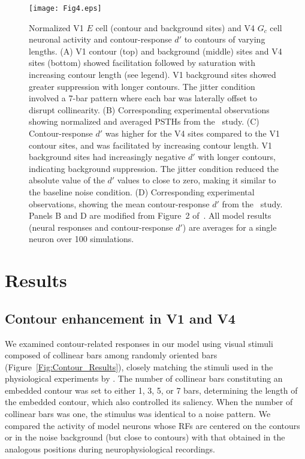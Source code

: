 \begin{figure*}
\begin{center}
\texttt{[image: Fig4.eps]}
\end{center}
\caption{Normalized V1 $E$ cell (contour and background sites) and V4
  $G_c$ cell neuronal activity and contour-response $d'$ to contours of
  varying lengths. (A) V1 contour (top) and background (middle) sites
  and V4 sites (bottom) showed facilitation followed by saturation
  with increasing contour length (see legend). V1 background sites
  showed greater suppression with longer contours. The jitter
  condition involved a 7-bar pattern where each bar was laterally
  offset to disrupt collinearity. (B) Corresponding experimental
  observations showing normalized and averaged PSTHs from
  the~\cite{Chen_etal14} study. 
  (C) Contour-response $d'$ was higher for the V4
  sites compared to the V1 contour sites, and was facilitated by
  increasing contour length. V1 background sites had increasingly
  negative $d'$ with longer contours, indicating background
  suppression. The jitter condition reduced the absolute value of the
  $d'$ values to close to zero, making it similar to the baseline
  noise condition. (D) Corresponding experimental observations,
  showing the mean contour-response $d'$ from the~\cite{Chen_etal14}
  study. 
  Panels B and D are modified from Figure~2 of~\cite{Chen_etal14}.
  All model results (neural responses and contour-response $d'$) are
  averages for a single neuron over 100 simulations.
}
\label{Fig:Neural_responses}
\end{figure*}

\section{Results}
\label{sec:results}
\subsection{Contour enhancement in V1 and V4}
We examined contour-related responses in our model using visual
stimuli composed of collinear bars among randomly oriented bars
(Figure~\ref{Fig:Contour_Results}), closely matching the stimuli used
in the physiological experiments by \cite{Chen_etal14}. The number of
collinear bars constituting an embedded contour
was set to either 1, 3, 5, or 7 bars, 
determining the length
of the embedded contour, 
which also controlled its saliency.
When the number of collinear bars was one, the stimulus was identical to a
noise pattern. We compared the activity of model neurons
whose RFs are centered on the contours 
or in the noise background (but close to contours)
with that obtained in the analogous positions during
neurophysiological recordings.

